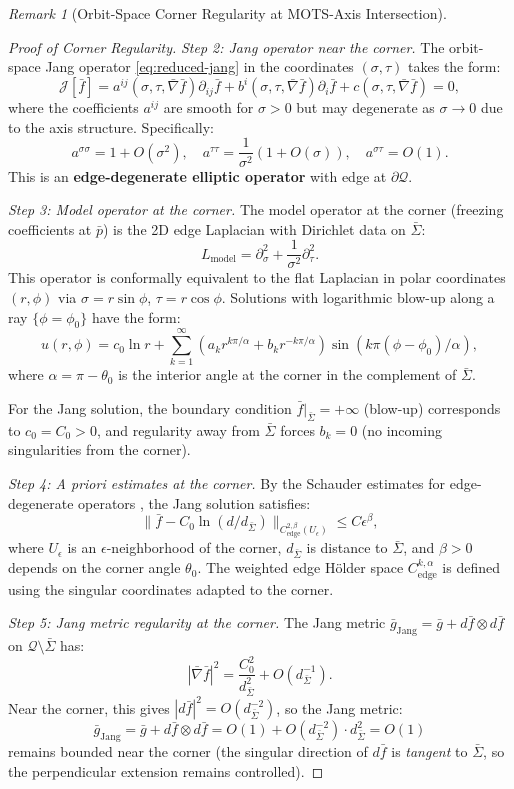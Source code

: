 \documentclass[12pt]{article}
\theoremstyle{plain}
\theoremstyle{definition}
\theoremstyle{remark}
\newtheorem{remark}[theorem]{Remark}
\begin{document}
\begin{remark}[Orbit-Space Corner Regularity at MOTS-Axis Intersection]
\begin{proof}[Proof of Corner Regularity]
\textit{Step 2: Jang operator near the corner.}
The orbit-space Jang operator \eqref{eq:reduced-jang} in the coordinates $(\sigma, \tau)$ takes the form:
\[
\mathcal{J}[\bar{f}] = a^{ij}(\sigma, \tau, \bar{\nabla}\bar{f})\partial_{ij}\bar{f} + b^i(\sigma, \tau, \bar{\nabla}\bar{f})\partial_i\bar{f} + c(\sigma, \tau, \bar{\nabla}\bar{f}) = 0,
\]
where the coefficients $a^{ij}$ are smooth for $\sigma > 0$ but may degenerate as $\sigma \to 0$ due to the axis structure. Specifically:
\[
a^{\sigma\sigma} = 1 + O(\sigma^2), \quad a^{\tau\tau} = \frac{1}{\sigma^2}(1 + O(\sigma)), \quad a^{\sigma\tau} = O(1).
\]
This is an \textbf{edge-degenerate elliptic operator} with edge at $\partial\mathcal{Q}$.

\textit{Step 3: Model operator at the corner.}
The model operator at the corner (freezing coefficients at $\bar{p}$) is the 2D edge Laplacian with Dirichlet data on $\bar{\Sigma}$:
\[
L_{\text{model}} = \partial_\sigma^2 + \frac{1}{\sigma^2}\partial_\tau^2.
\]
This operator is conformally equivalent to the flat Laplacian in polar coordinates $(r, \phi)$ via $\sigma = r\sin\phi$, $\tau = r\cos\phi$. Solutions with logarithmic blow-up along a ray $\{\phi = \phi_0\}$ have the form:
\[
u(r, \phi) = c_0 \ln r + \sum_{k=1}^\infty (a_k r^{k\pi/\alpha} + b_k r^{-k\pi/\alpha})\sin(k\pi(\phi - \phi_0)/\alpha),
\]
where $\alpha = \pi - \theta_0$ is the interior angle at the corner in the complement of $\bar{\Sigma}$.

For the Jang solution, the boundary condition $\bar{f}|_{\bar{\Sigma}} = +\infty$ (blow-up) corresponds to $c_0 = C_0 > 0$, and regularity away from $\bar{\Sigma}$ forces $b_k = 0$ (no incoming singularities from the corner).

\textit{Step 4: A priori estimates at the corner.}
By the Schauder estimates for edge-degenerate operators \cite[Theorem 5.4.1]{schulze1998}, the Jang solution satisfies:
\[
\|\bar{f} - C_0\ln(d/d_{\bar{\Sigma}})\|_{C^{2,\beta}_{\text{edge}}(U_\epsilon)} \leq C\epsilon^\beta,
\]
where $U_\epsilon$ is an $\epsilon$-neighborhood of the corner, $d_{\bar{\Sigma}}$ is distance to $\bar{\Sigma}$, and $\beta > 0$ depends on the corner angle $\theta_0$. The weighted edge H\"older space $C^{k,\alpha}_{\text{edge}}$ is defined using the singular coordinates adapted to the corner.

\textit{Step 5: Jang metric regularity at the corner.}
The Jang metric $\bar{g}_{\text{Jang}} = \bar{g} + d\bar{f} \otimes d\bar{f}$ on $\mathcal{Q} \setminus \bar{\Sigma}$ has:
\[
|\bar{\nabla}\bar{f}|^2 = \frac{C_0^2}{d_{\bar{\Sigma}}^2} + O(d_{\bar{\Sigma}}^{-1}).
\]
Near the corner, this gives $|d\bar{f}|^2 = O(d_{\bar{\Sigma}}^{-2})$, so the Jang metric:
\[
\bar{g}_{\text{Jang}} = \bar{g} + d\bar{f} \otimes d\bar{f} = O(1) + O(d_{\bar{\Sigma}}^{-2}) \cdot d_{\bar{\Sigma}}^2 = O(1)
\]
remains bounded near the corner (the singular direction of $d\bar{f}$ is \textit{tangent} to $\bar{\Sigma}$, so the perpendicular extension remains controlled).


\end{proof}
\end{remark}
\end{document}
